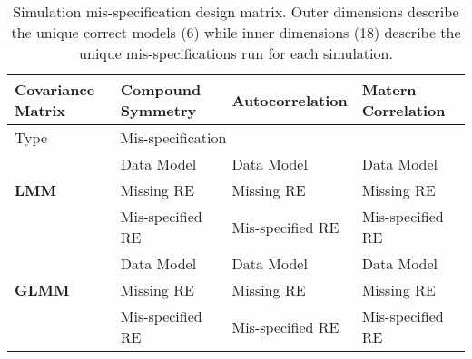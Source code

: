 \begin{table}[ht]
    \caption{Simulation mis-specification design matrix. Outer dimensions describe the unique correct models (6) while inner dimensions (18) describe the unique mis-specifications run for each simulation.}
    \begin{tabular}{l|llp{8cm}}
    \toprule
    Covariance Matrix & \textbf{Compound Symmetry} & \textbf{Autocorrelation} & \textbf{Matern Correlation} \\
    \hline
     Type &\multicolumn{3}{l}{Mis-specification}\\
     \hline
     & Data Model & Data Model & Data Model \\
     \textbf{LMM}& Missing RE & Missing RE & Missing RE \\
     & Mis-specified RE & Mis-specified RE & Mis-specified RE \\
     \hline
     & Data Model & Data Model & Data Model \\
     \textbf{GLMM}& Missing RE & Missing RE & Missing RE \\
     & Mis-specified RE & Mis-specified RE & Mis-specified RE \\
    \bottomrule
    \end{tabular}
  \end{table}

